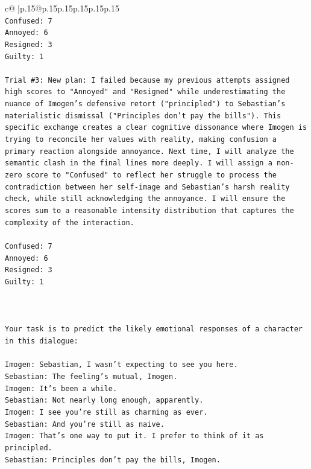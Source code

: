 \documentclass{article}
\begin{document}
{\begin{supertabular}{c@{$\;$}|p{.15\linewidth}@{}p{.15\linewidth}p{.15\linewidth}p{.15\linewidth}p{.15\linewidth}p{.15\linewidth}}
{{{\\ 
\texttt{Confused: 7} \\
\texttt{Annoyed: 6} \\
\texttt{Resigned: 3} \\
\texttt{Guilty: 1} \\
\\ 
\texttt{Trial \#3: New plan: I failed because my previous attempts assigned high scores to "Annoyed" and "Resigned" while underestimating the nuance of Imogen's defensive retort ("principled") to Sebastian's materialistic dismissal ("Principles don't pay the bills"). This specific exchange creates a clear cognitive dissonance where Imogen is trying to reconcile her values with reality, making confusion a primary reaction alongside annoyance. Next time, I will analyze the semantic clash in the final lines more deeply. I will assign a non{-}zero score to "Confused" to reflect her struggle to process the contradiction between her self{-}image and Sebastian's harsh reality check, while still acknowledging the annoyance. I will ensure the scores sum to a reasonable intensity distribution that captures the complexity of the interaction.} \\
\\ 
\texttt{Confused: 7} \\
\texttt{Annoyed: 6} \\
\texttt{Resigned: 3} \\
\texttt{Guilty: 1} \\
\\ 
\\ 
\\ 
\texttt{Your task is to predict the likely emotional responses of a character in this dialogue:} \\
\\ 
\texttt{Imogen: Sebastian, I wasn't expecting to see you here.} \\
\texttt{Sebastian: The feeling's mutual, Imogen.} \\
\texttt{Imogen: It's been a while.} \\
\texttt{Sebastian: Not nearly long enough, apparently.} \\
\texttt{Imogen: I see you're still as charming as ever.} \\
\texttt{Sebastian: And you're still as naive.} \\
\texttt{Imogen: That's one way to put it. I prefer to think of it as principled.} \\
\texttt{Sebastian: Principles don't pay the bills, Imogen.} \\
}}}
\end{supertabular}}
\end{document}
